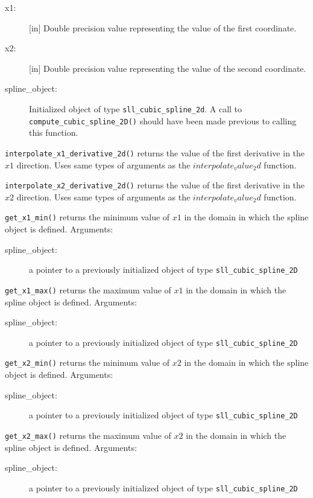 \documentclass[]{report}   %
\begin{document}
\begin{description}
	\begin{description}
		\item[ x1:] [in] Double precision value representing the value of the first coordinate.
		\item[ x2:] [in] Double precision value representing the value of the second coordinate.
		\item[ spline\_object: ] Initialized object of type \verb+sll_cubic_spline_2d+. A call to \verb+compute_cubic_spline_2D()+ should have been made previous to calling this function.
	\end{description}

	\item \verb+interpolate_x1_derivative_2d()+ returns the value of the first derivative in the $x1$ direction. Uses same types of arguments as the $interpolate_value_2d$ function.
	
	\item \verb+interpolate_x2_derivative_2d()+ returns the value of the first derivative in the $x2$ direction. Uses same types of arguments as the $interpolate_value_2d$ function.
	
	
	\item \verb+get_x1_min()+ returns the minimum value of $x1$ in the domain in which the spline object is defined. Arguments:
		\begin{description}
			\item[spline\_object:] a pointer to a previously initialized object of type \verb+sll_cubic_spline_2D+
		\end{description}
	
	\item \verb+get_x1_max()+ returns the maximum value of $x1$ in the domain in which the spline object is defined. Arguments:
		\begin{description}
			\item[spline\_object:] a pointer to a previously initialized object of type \verb+sll_cubic_spline_2D+
		\end{description}
		
	\item \verb+get_x2_min()+ returns the minimum value of $x2$ in the domain in which the spline object is defined. Arguments:
		\begin{description}
			\item[spline\_object:] a pointer to a previously initialized object of type \verb+sll_cubic_spline_2D+
		\end{description}
	
	\item \verb+get_x2_max()+ returns the maximum value of $x2$ in the domain in which the spline object is defined. Arguments:
		\begin{description}
			\item[spline\_object:] a pointer to a previously initialized object of type \verb+sll_cubic_spline_2D+
		\end{description}
		

\end{description}
\end{document}
